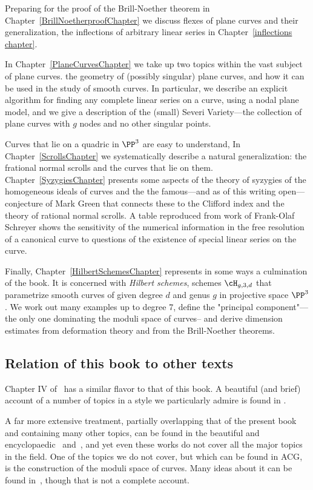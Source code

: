 Preparing for the proof of the Brill-Noether theorem in Chapter~\ref{BrillNoetherproofChapter} we discuss flexes of plane curves and their 
generalization, the inflections of arbitrary linear series in Chapter~\ref{inflections chapter}. 

In Chapter~\ref{PlaneCurvesChapter} we take up two topics within the vast subject  of plane curves. the geometry of (possibly singular) plane curves, and how it can be used in the study of smooth curves. In particular, we describe an explicit algorithm for finding any complete linear series on a curve, using a nodal plane model, and we give a description of the 
(small) Severi Variety---the collection of plane curves with $g$ nodes and no other singular points.

Curves that lie on a quadric in $\PP^3$ are easy to understand, In Chapter~\ref{ScrollsChapter} we systematically describe a natural generalization: the frational normal scrolls and the curves that lie on them. Chapter~\ref{SyzygiesChapter} presents some aspects of the theory of syzygies of the homogeneous ideals of curves and the the famous---and as of this writing open---conjecture of Mark Green that connects these to the Clifford index and the theory of rational normal scrolls. A table reproduced from work of Frank-Olaf Schreyer shows the sensitivity of the numerical information in the free resolution of a canonical curve to questions of the existence of special linear series on the curve.

 Finally, Chapter~\ref{HilbertSchemesChapter} represents in some ways a culmination of the book. It is concerned with \emph{Hilbert schemes}, schemes $\cH_{g,3,d}$ that parametrize smooth curves of given degree $d$ and genus $g$ in projective space $\PP^3$. We work out many examples up to degree 7, define the "principal component"---the only one dominating the moduli space of curves-- and derive dimension estimates from deformation theory and from the Brill-Noether theorems.

\subsection{Relation of this book to other texts} 
Chapter IV of~\cite{Hartshorne1977} has a similar flavor to that of this book. A beautiful (and brief) account of a number of topics in a style we particularly admire is found in \cite{MumfordCJ}.

A far more extensive treatment, partially overlapping that of the present book and containing many other topics, can be found in the beautiful and encyclopaedic~\cite{ACGH} and~\cite{ACG}, and yet even these works do not cover all the major topics in the field. 
One of the topics we do not cover, but which can be found in {ACG}, is the construction of the moduli space of curves. Many  ideas  about it can be found in~\cite{HarrisMorrison1998}, though  that is not a complete account. 

